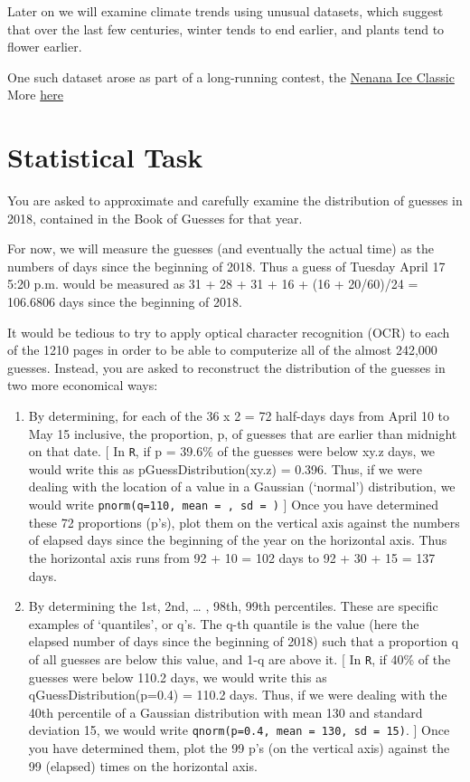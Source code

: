 \documentclass[]{book}
\begin{document}
Later on we will examine climate trends using unusual datasets, which suggest that over the last few centuries, winter tends to end earlier, and plants tend to flower earlier.

One such dataset arose as part of a long-running contest, the \href{http://www.nenanaakiceclassic.com}{Nenana Ice Classic}
More \href{http://www.john-daly.com/nenana.htm}{here}

\hypertarget{statistical-task-1}{%
\section{Statistical Task}\label{statistical-task-1}}

You are asked to approximate and carefully examine the distribution of guesses in 2018, contained in the Book of Guesses for that year.

For now, we will measure the guesses (and eventually the actual time) as the numbers of days since the beginning of 2018. Thus a guess of Tuesday April 17 5:20 p.m. would be measured as 31 + 28 + 31 + 16 + (16 + 20/60)/24 = 106.6806 days since the beginning of 2018.

It would be tedious to try to apply optical character recognition (OCR) to each of the 1210 pages in order to be able to computerize all of the almost 242,000 guesses. Instead, you are asked to reconstruct the distribution of the guesses in two more economical ways:

\begin{enumerate}
\def\labelenumi{\arabic{enumi}.}
\item
  By determining, for each of the 36 x 2 = 72 half-days days from April 10 to May 15 inclusive, the proportion, p, of guesses that are earlier than midnight on that date. {[} In \texttt{R}, if p = 39.6\% of the guesses were below xy.z days, we would write this as pGuessDistribution(xy.z) = 0.396. Thus, if we were dealing with the location of a value in a Gaussian (`normal') distribution, we would write \texttt{pnorm(q=110,\ mean\ =\ ,\ sd\ =\ )} {]} Once you have determined these 72 proportions (p's), plot them on the vertical axis against the numbers of elapsed days since the beginning of the year on the horizontal axis. Thus the horizontal axis runs from 92 + 10 = 102 days to 92 + 30 + 15 = 137 days.
\item
  By determining the 1st, 2nd, \ldots{} , 98th, 99th percentiles. These are specific examples of `quantiles', or q's. The q-th quantile is the value (here the elapsed number of days since the beginning of 2018) such that a proportion q of all guesses are below this value, and 1-q are above it. {[} In \texttt{R}, if 40\% of the guesses were below 110.2 days, we would write this as qGuessDistribution(p=0.4) = 110.2 days. Thus, if we were dealing with the 40th percentile of a Gaussian distribution with mean 130 and standard deviation 15, we would write \texttt{qnorm(p=0.4,\ mean\ =\ 130,\ sd\ =\ 15)}. {]} Once you have determined them, plot the 99 p's (on the vertical axis) against the 99 (elapsed) times on the horizontal axis.
\end{enumerate}
\end{document}
